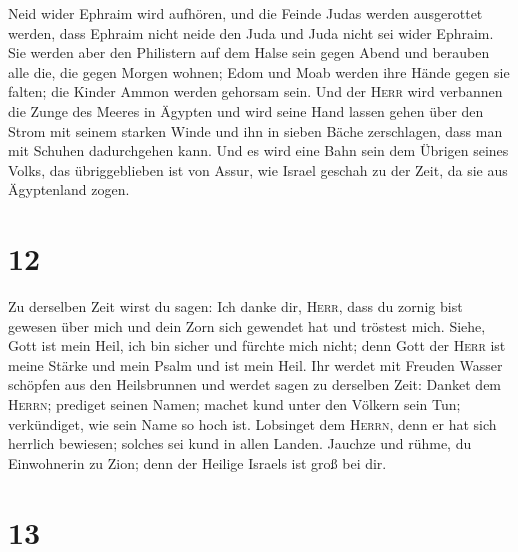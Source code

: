 Neid wider Ephraim wird aufhören, und die Feinde Judas werden
ausgerottet werden, dass Ephraim nicht neide den Juda und Juda nicht sei
wider Ephraim.  Sie werden aber den Philistern auf dem
Halse sein gegen Abend und berauben alle die, die gegen Morgen wohnen;
Edom und Moab werden ihre Hände gegen sie falten; die Kinder Ammon
werden gehorsam sein.  Und der \textsc{Herr} wird
verbannen die Zunge des Meeres in Ägypten und wird seine Hand lassen
gehen über den Strom mit seinem starken Winde und ihn in sieben Bäche
zerschlagen, dass man mit Schuhen dadurchgehen kann.  Und
es wird eine Bahn sein dem Übrigen seines Volks, das übriggeblieben ist
von Assur, wie Israel geschah zu der Zeit, da sie aus Ägyptenland zogen.

\hypertarget{section-11}{%
\section{12}\label{section-11}}

 Zu derselben Zeit wirst du sagen: Ich danke dir,
\textsc{Herr}, dass du zornig bist gewesen über mich und dein Zorn sich
gewendet hat und tröstest mich.  Siehe, Gott ist mein
Heil, ich bin sicher und fürchte mich nicht; denn Gott der \textsc{Herr}
ist meine Stärke und mein Psalm und ist mein Heil.  Ihr
werdet mit Freuden Wasser schöpfen aus den Heilsbrunnen 
und werdet sagen zu derselben Zeit: Danket dem \textsc{Herrn}; prediget
seinen Namen; machet kund unter den Völkern sein Tun; verkündiget, wie
sein Name so hoch ist.  Lobsinget dem \textsc{Herrn}, denn
er hat sich herrlich bewiesen; solches sei kund in allen Landen.
 Jauchze und rühme, du Einwohnerin zu Zion; denn der
Heilige Israels ist groß bei dir.

\hypertarget{section-12}{%
\section{13}\label{section-12}}

